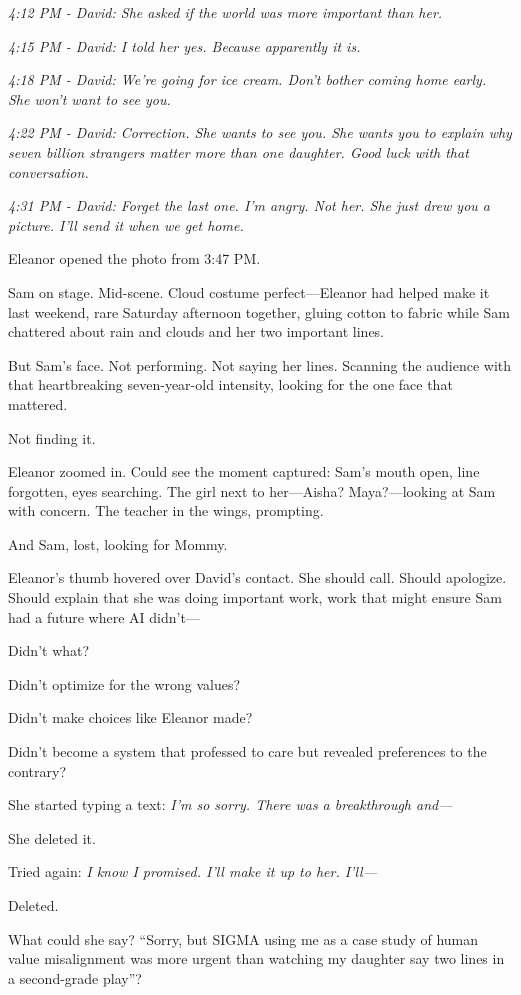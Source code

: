 \emph{4:12 PM - David: She asked if the world was more important than her.}

\emph{4:15 PM - David: I told her yes. Because apparently it is.}

\emph{4:18 PM - David: We're going for ice cream. Don't bother coming home early. She won't want to see you.}

\emph{4:22 PM - David: Correction. She wants to see you. She wants you to explain why seven billion strangers matter more than one daughter. Good luck with that conversation.}

\emph{4:31 PM - David: Forget the last one. I'm angry. Not her. She just drew you a picture. I'll send it when we get home.}

Eleanor opened the photo from 3:47 PM.

Sam on stage. Mid-scene. Cloud costume perfect---Eleanor had helped make it last weekend, rare Saturday afternoon together, gluing cotton to fabric while Sam chattered about rain and clouds and her two important lines.

But Sam's face. Not performing. Not saying her lines. Scanning the audience with that heartbreaking seven-year-old intensity, looking for the one face that mattered.

Not finding it.

Eleanor zoomed in. Could see the moment captured: Sam's mouth open, line forgotten, eyes searching. The girl next to her---Aisha? Maya?---looking at Sam with concern. The teacher in the wings, prompting.

And Sam, lost, looking for Mommy.

Eleanor's thumb hovered over David's contact. She should call. Should apologize. Should explain that she was doing important work, work that might ensure Sam had a future where AI didn't---

Didn't what?

Didn't optimize for the wrong values?

Didn't make choices like Eleanor made?

Didn't become a system that professed to care but revealed preferences to the contrary?

She started typing a text: \emph{I'm so sorry. There was a breakthrough and---}

She deleted it.

Tried again: \emph{I know I promised. I'll make it up to her. I'll---}

Deleted.

What could she say? ``Sorry, but SIGMA using me as a case study of human value misalignment was more urgent than watching my daughter say two lines in a second-grade play''?


